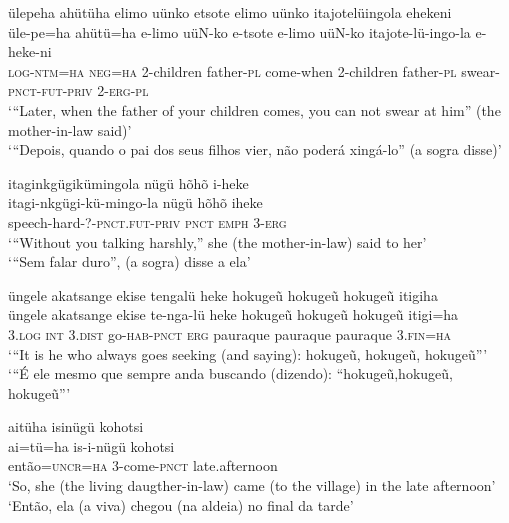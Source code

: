 \documentclass[output=paper,
modfonts,nonflat
]{langsci/langscibook}
\begin{document}
\ea ülepeha ahütüha elimo uünko etsote elimo uünko itajotelüingola ehekeni \\[.3em]
\gll üle-pe=ha ahütü=ha e-limo uüN-ko e-tsote  e-limo uüN-ko itajote-lü-ingo-la e-heke-ni\\
\textsc{log-ntm=ha} \textsc{neg=ha} 2-children father-\textsc{pl} come-when
2-children father-\textsc{pl} swear-\textsc{pnct-fut-priv} \textsc{2-erg-pl} \\
\glt ‘“Later, when the father of your children comes, you can not swear at him” (the mother-in-law said)’ \\
‘“Depois, quando o pai dos seus filhos vier, não poderá xingá-lo” (a sogra disse)’ \\
\z

\ea itaginkgügikümingola nügü hõhõ i-heke \\[.3em]
\gll itagi-nkgügi-kü-mingo-la nügü hõhõ iheke \\
speech-hard-?-\textsc{pnct.fut-priv} \textsc{pnct} \textsc{emph} \textsc{3-erg} \\
\glt ‘“Without you talking harshly,” she (the mother-in-law) said to her’ \\
‘“Sem falar duro”, (a sogra) disse a ela’ \\
\z

\ea üngele akatsange ekise tengalü heke  hokugeũ hokugeũ  hokugeũ itigiha \\[.3em]
\gll üngele akatsange ekise te-nga-lü heke hokugeũ hokugeũ hokugeũ itigi=ha \\
3.\textsc{log} \textsc{int} \textsc{3.dist} go\textsc{-hab-pnct} \textsc{erg} pauraque pauraque pauraque \textsc{3.fin=ha} \\
\glt ‘“It is he who always goes seeking (and saying): hokugeũ{\footnotemark}{}, hokugeũ, hokugeũ”’ \\
‘“É ele mesmo que sempre anda buscando (dizendo): “hokugeũ,hokugeũ, hokugeũ”’  \\
\z

\ea aitüha isinügü kohotsi \\[.3em]
\gll ai=tü=ha is-i-nügü kohotsi \\
então=\textsc{uncr=ha} 3-come\textsc{-pnct} late.afternoon \\
\glt ‘So, she (the living daugther-in-law) came (to the village) in the late afternoon’  \\
‘Então, ela (a viva) chegou (na aldeia) no final da tarde’ \\
\z
\end{document}
